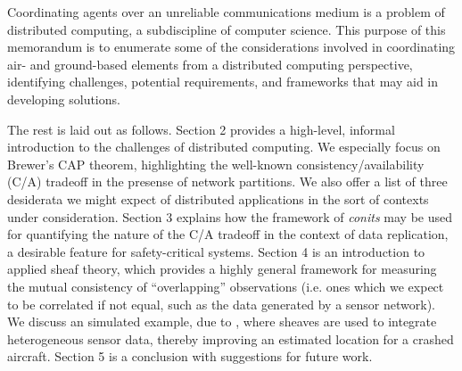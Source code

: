 Coordinating agents over an unreliable communications medium is a
problem of distributed computing, a subdiscipline of computer
science. This purpose of this memorandum is to enumerate some of the
considerations involved in coordinating air- and ground-based elements
from a distributed computing perspective, identifying challenges,
potential requirements, and frameworks that may aid in developing
solutions.

The rest is laid out as follows. Section 2 provides a high-level,
informal introduction to the challenges of distributed computing. We
especially focus on Brewer's CAP theorem, highlighting the well-known
consistency/availability (C/A) tradeoff in the presense of network
partitions. We also offer a list of three desiderata we might expect
of distributed applications in the sort of contexts under
consideration.  Section 3 explains how the framework of \emph{conits}
\cite{} may be used for quantifying the nature of the C/A tradeoff in
the context of data replication, a desirable feature for
safety-critical systems. Section 4 is an introduction to applied sheaf
theory, which provides a highly general framework for measuring the
mutual consistency of ``overlapping'' observations (i.e. ones which we
expect to be correlated if not equal, such as the data generated by a
sensor network). We discuss an simulated example, due to \cite{},
where sheaves are used to integrate heterogeneous sensor data, thereby
improving an estimated location for a crashed aircraft. Section 5 is a
conclusion with suggestions for future work.
